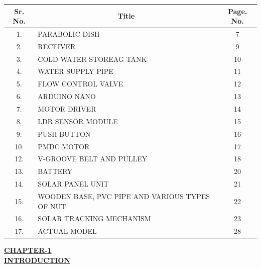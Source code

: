\documentclass[12pt,a4paper]{article}
\begin{document}
\begin{center}
\renewcommand{\arraystretch}{1.28}
\begin{tabular}{|c|p{80mm}|c|}
\hline
\rowcolor{gray!20}
\textbf{Sr. No.} & \multicolumn{1}{c|}{\textbf{Title}} & \textbf{Page. No.} \\
\hline
1. & PARABOLIC DISH & 7 \\
\hline
2. & RECEIVER & 9 \\
\hline
3. & COLD WATER STOREAG TANK & 10 \\
\hline
4. & WATER SUPPLY PIPE & 11 \\
\hline
5. & FLOW CONTROL VALVE & 12 \\
\hline
6. & ARDUINO NANO & 13 \\
\hline
7. & MOTOR DRIVER & 14 \\
\hline
8. & LDR SENSOR MODULE & 15 \\
\hline
9. & PUSH BUTTON & 16 \\
\hline
10. & PMDC MOTOR & 17 \\
\hline
12. & V-GROOVE BELT AND PULLEY & 18 \\
\hline
13. & BATTERY & 20 \\
\hline
14. & SOLAR PANEL UNIT & 21 \\
\hline
15. & WOODEN BASE, PVC PIPE AND VARIOUS TYPES OF NUT & 22 \\
\hline
16. & SOLAR TRACKING MECHANISM & 23 \\
\hline
17. & ACTUAL MODEL & 28 \\
\hline
\end{tabular}
\end{center}
\clearpage




\begin{center}
  {\fontsize{15}{18}\selectfont \bfseries \textcolor{red!80!black}{\underline{CHAPTER-1}}}\\[2mm]
  {\fontsize{16}{20}\selectfont \bfseries \textcolor{red!80!black}{\underline{INTRODUCTION}}}\\[6mm]
\end{center}
\end{document}

